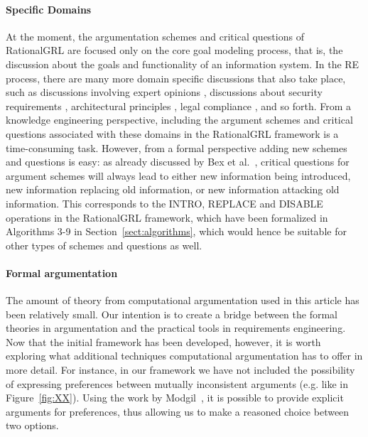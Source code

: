 \paragraph{Specific Domains}
At the moment, the argumentation schemes and critical questions of RationalGRL are focused only on the core goal modeling process, that is, the discussion about the goals and functionality of an information system. In the RE process, there are many more domain specific discussions that also take place, such as discussions involving expert opinions \cite{murukannaiah2015}, discussions about security requirements \cite{haley2008security,yu2015automated,ionita2014argumentation}, architectural principles \cite{marosin-etal:caise2016}, legal compliance \cite{Ghanavati2013}, and so forth. From a knowledge engineering perspective, including the argument schemes and critical questions associated with these domains in the RationalGRL framework is a time-consuming task. However, from a formal perspective adding new schemes and questions is easy: as already discussed by Bex et al.~\cite{bexEtal2003}, critical questions for argument schemes will always lead to either new information being introduced, new information replacing old information, or new information attacking old information. This corresponds to the \textsf{INTRO}, \textsf{REPLACE} and \textsf{DISABLE} operations in the RationalGRL framework, which have been formalized in Algorithms 3-9 in Section~\ref{sect:algorithms}, which would hence be suitable for other types of schemes and questions as well.

\paragraph{Formal argumentation}
The amount of theory from computational argumentation used in this article has been relatively small. Our intention is to create a bridge between the formal theories in argumentation and the practical tools in requirements engineering. Now that the initial framework has been developed, however, it is worth exploring what additional techniques computational argumentation has to offer in more detail. For instance, in our framework we have not included the possibility of expressing preferences between mutually inconsistent arguments (e.g. like in Figure~\ref{fig:XX}). Using the work by Modgil~\cite{modgil2009}, it is possible to provide explicit arguments for preferences, thus allowing us to make a reasoned choice between two options. 

